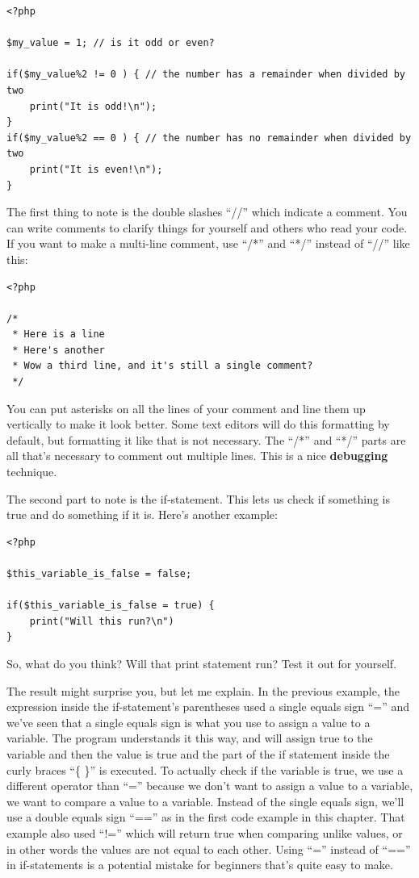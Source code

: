 \documentclass[
]{book}
\begin{document}
\begin{verbatim}
<?php

$my_value = 1; // is it odd or even?

if($my_value%2 != 0 ) { // the number has a remainder when divided by two
    print("It is odd!\n");
}
if($my_value%2 == 0 ) { // the number has no remainder when divided by two
    print("It is even!\n");
}
\end{verbatim}

The first thing to note is the double slashes ``//'' which indicate a comment. You can write comments to clarify things for yourself and others who read your code. If you want to make a multi-line comment, use ``/*'' and ``*/'' instead of ``//'' like this:

\begin{verbatim}
<?php 

/*
 * Here is a line
 * Here's another
 * Wow a third line, and it's still a single comment?
 */
\end{verbatim}

You can put asterisks on all the lines of your comment and line them up vertically to make it look better. Some text editors will do this formatting by default, but formatting it like that is not necessary. The ``/*'' and ``*/'' parts are all that's necessary to comment out multiple lines. This is a nice \textbf{debugging} technique.

The second part to note is the if-statement. This lets us check if something is true and do something if it is. Here's another example:

\begin{verbatim}
<?php

$this_variable_is_false = false;

if($this_variable_is_false = true) {
    print("Will this run?\n")
}
\end{verbatim}

So, what do you think? Will that print statement run? Test it out for yourself.

The result might surprise you, but let me explain. In the previous example, the expression inside the if-statement's parentheses used a single equals sign ``='' and we've seen that a single equals sign is what you use to assign a value to a variable. The program understands it this way, and will assign true to the variable and then the value is true and the part of the if statement inside the curly braces ``\{ \}'' is executed. To actually check if the variable is true, we use a different operator than ``='' because we don't want to assign a value to a variable, we want to compare a value to a variable. Instead of the single equals sign, we'll use a double equals sign ``=='' as in the first code example in this chapter. That example also used ``!='' which will return true when comparing unlike values, or in other words the values are not equal to each other. Using ``='' instead of ``=='' in if-statements is a potential mistake for beginners that's quite easy to make.
\end{document}
